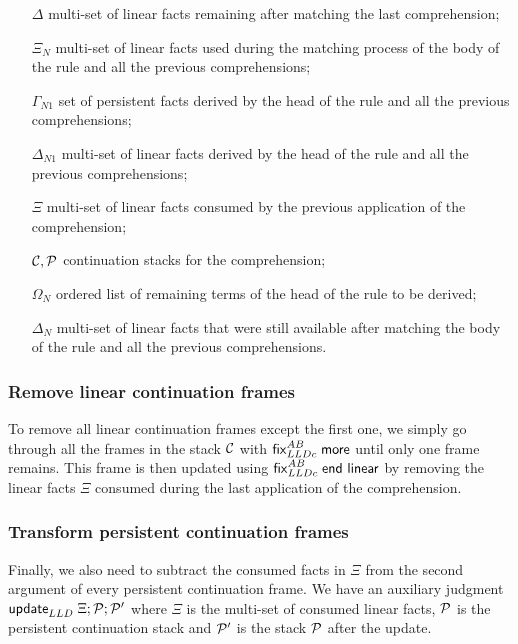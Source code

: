 \begin{enumerate}
   \item[$\Delta$] multi-set of linear facts remaining after matching the last
   comprehension;
   \item[$\Xi_N$] multi-set of linear facts used during the matching process of
   the body of the rule and all the previous comprehensions;
   \item[$\Gamma_{N1}$] set of persistent facts derived by the head of the rule
   and all the previous comprehensions;
   \item[$\Delta_{N1}$] multi-set of linear facts derived by the head of the
   rule and all the previous comprehensions;
   \item[$\Xi$] multi-set of linear facts consumed by the previous application
   of the comprehension;
   \item[$\mathcal{C}, \mathcal{P}$] continuation stacks for the comprehension;
   \item[$\Omega_N$] ordered list of remaining terms of the head of the rule to
   be derived;
   \item[$\Delta_N$] multi-set of linear facts that were still available after
   matching the body of the rule and all the previous comprehensions.
\end{enumerate}

\subsubsection{Remove linear continuation frames}

To remove all linear continuation frames except the first one, we simply go
through all the frames in the stack $\mathcal{C}$ with $\mathsf{fix}_{LLDc}^{AB} \; \mathsf{more}$
until only one frame remains. This frame is then updated using $\mathsf{fix}_{LLDc}^{AB} \; \mathsf{end~linear}$ by removing the linear facts $\Xi$ consumed
during the last application of the comprehension.



\subsubsection{Transform persistent continuation frames}

Finally, we also need to subtract the consumed facts in $\Xi$ from the second
argument of every persistent continuation frame.  We have an auxiliary judgment
$\mathsf{update}_{LLD} \; \Xi; \mathcal{P}; \mathcal{P'}$ where $\Xi$ is the multi-set of consumed
linear facts, $\mathcal{P}$ is the persistent continuation stack and
$\mathcal{P'}$ is the stack $\mathcal{P}$ after the update.

